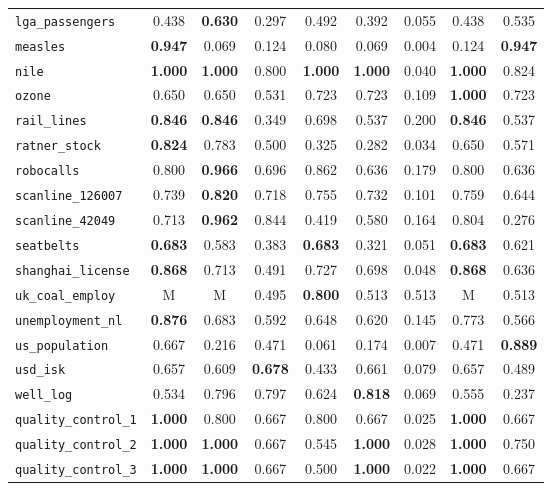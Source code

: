 \begin{tabular}{lcccccccc}
\verb+lga_passengers+ & 0.438 & \textbf{0.630} & 0.297 & 0.492 & 0.392 & 0.055 & 0.438 & 0.535\\
\verb+measles+ & \textbf{0.947} & 0.069 & 0.124 & 0.080 & 0.069 & 0.004 & 0.124 & \textbf{0.947}\\
\verb+nile+ & \textbf{1.000} & \textbf{1.000} & 0.800 & \textbf{1.000} & \textbf{1.000} & 0.040 & \textbf{1.000} & 0.824\\
\verb+ozone+ & 0.650 & 0.650 & 0.531 & 0.723 & 0.723 & 0.109 & \textbf{1.000} & 0.723\\
\verb+rail_lines+ & \textbf{0.846} & \textbf{0.846} & 0.349 & 0.698 & 0.537 & 0.200 & \textbf{0.846} & 0.537\\
\verb+ratner_stock+ & \textbf{0.824} & 0.783 & 0.500 & 0.325 & 0.282 & 0.034 & 0.650 & 0.571\\
\verb+robocalls+ & 0.800 & \textbf{0.966} & 0.696 & 0.862 & 0.636 & 0.179 & 0.800 & 0.636\\
\verb+scanline_126007+ & 0.739 & \textbf{0.820} & 0.718 & 0.755 & 0.732 & 0.101 & 0.759 & 0.644\\
\verb+scanline_42049+ & 0.713 & \textbf{0.962} & 0.844 & 0.419 & 0.580 & 0.164 & 0.804 & 0.276\\
\verb+seatbelts+ & \textbf{0.683} & 0.583 & 0.383 & \textbf{0.683} & 0.321 & 0.051 & \textbf{0.683} & 0.621\\
\verb+shanghai_license+ & \textbf{0.868} & 0.713 & 0.491 & 0.727 & 0.698 & 0.048 & \textbf{0.868} & 0.636\\
\verb+uk_coal_employ+ & M & M & 0.495 & \textbf{0.800} & 0.513 & 0.513 & M & 0.513\\
\verb+unemployment_nl+ & \textbf{0.876} & 0.683 & 0.592 & 0.648 & 0.620 & 0.145 & 0.773 & 0.566\\
\verb+us_population+ & 0.667 & 0.216 & 0.471 & 0.061 & 0.174 & 0.007 & 0.471 & \textbf{0.889}\\
\verb+usd_isk+ & 0.657 & 0.609 & \textbf{0.678} & 0.433 & 0.661 & 0.079 & 0.657 & 0.489\\
\verb+well_log+ & 0.534 & 0.796 & 0.797 & 0.624 & \textbf{0.818} & 0.069 & 0.555 & 0.237\\
\midrule
\verb+quality_control_1+ & \textbf{1.000} & 0.800 & 0.667 & 0.800 & 0.667 & 0.025 & \textbf{1.000} & 0.667\\
\verb+quality_control_2+ & \textbf{1.000} & \textbf{1.000} & 0.667 & 0.545 & \textbf{1.000} & 0.028 & \textbf{1.000} & 0.750\\
\verb+quality_control_3+ & \textbf{1.000} & \textbf{1.000} & 0.667 & 0.500 & \textbf{1.000} & 0.022 & \textbf{1.000} & 0.667\\

\end{tabular}
